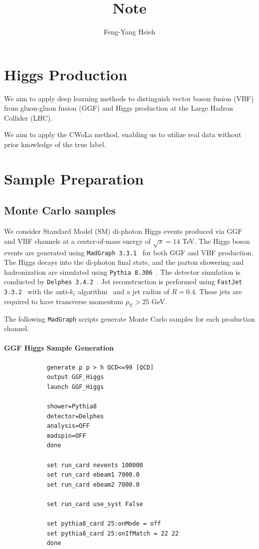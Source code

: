 \documentclass[12pt]{article}
\title{Note}
\author{Feng-Yang Hsieh}
\date{}
\begin{document}
\maketitle

\section{Higgs Production}%
\label{sec:higgs_production}
    We aim to apply deep learning methods to distinguish vector boson fusion (VBF) from gluon-gluon fusion (GGF) and Higgs production at the Large Hadron Collider (LHC).

    We aim to apply the CWoLa method, enabling us to utilize real data without prior knowledge of the true label.
\section{Sample Preparation}%
\label{sec:sample_preparation}
    \subsection{Monte Carlo samples}%
    \label{sub:monte_carlo_samples}
        We consider Standard Model (SM) di-photon Higgs events produced via GGF and VBF channels at a center-of-mass energy of $\sqrt{s} = 14$ TeV. The Higgs boson events are generated using \verb|MadGraph 3.3.1|~\cite{Alwall:2014hca} for both GGF and VBF production. The Higgs decays into the di-photon final state, and the parton showering and hadronization are simulated using \verb|Pythia 8.306|~\cite{Sjostrand:2014zea}. The detector simulation is conducted by \verb|Delphes 3.4.2|~\cite{deFavereau:2013fsa}. Jet reconstruction is performed using \verb|FastJet 3.3.2|~\cite{Cacciari:2011ma} with the anti-$k_t$ algorithm~\cite{Cacciari:2008gp} and a jet radius of $R = 0.4$. These jets are required to have transverse momentum $p_{\text{T}} > 25$ GeV.

        The following \verb|MadGraph| scripts generate Monte Carlo samples for each production channel.
        \paragraph{GGF Higgs Sample Generation}
        \begin{lstlisting}
            generate p p > h QCD<=99 [QCD]
            output GGF_Higgs
            launch GGF_Higgs

            shower=Pythia8
            detector=Delphes
            analysis=OFF
            madspin=OFF
            done

            set run_card nevents 100000
            set run_card ebeam1 7000.0
            set run_card ebeam2 7000.0

            set run_card use_syst False

            set pythia8_card 25:onMode = off
            set pythia8_card 25:onIfMatch = 22 22
            done
        \end{lstlisting}
\end{document}
